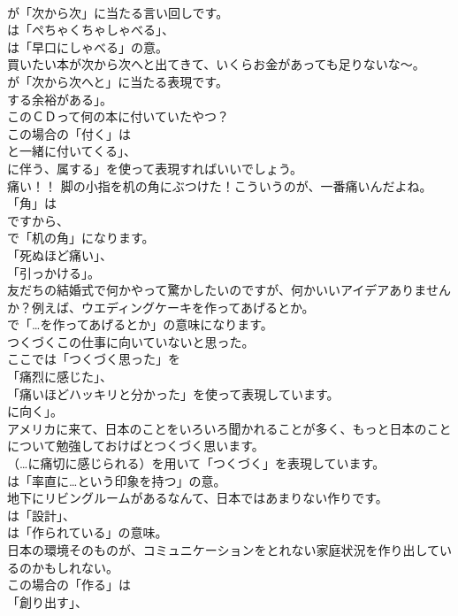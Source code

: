 \documentclass[8pt]{extreport}
\begin{document}
\begin{CJK}{UTF8}{min}
\\	が「次から次」に当たる言い回しです。
\\	は「ぺちゃくちゃしゃべる」、
\\	は「早口にしゃべる」の意。	
\\	買いたい本が次から次へと出てきて、いくらお金があっても足りないな～。 
\\	が「次から次へと」に当たる表現です。
\\	する余裕がある」。	
\\	このＣＤって何の本に付いていたやつ？ 
\\	この場合の「付く」は
\\	と一緒に付いてくる」、
\\	に伴う、属する」を使って表現すればいいでしょう。	
\\	痛い！！ 脚の小指を机の角にぶつけた！こういうのが、一番痛いんだよね。 
\\	「角」は
\\	ですから、
\\	で「机の角」になります。
\\	「死ぬほど痛い」、
\\	「引っかける」。	
\\	友だちの結婚式で何かやって驚かしたいのですが、何かいいアイデアありませんか？例えば、ウエディングケーキを作ってあげるとか。 
\\	で「…を作ってあげるとか」の意味になります。	
\\	つくづくこの仕事に向いていないと思った。 
\\	ここでは「つくづく思った」を
\\	「痛烈に感じた」、
\\	「痛いほどハッキリと分かった」を使って表現しています。
\\	に向く」。	
\\	アメリカに来て、日本のことをいろいろ聞かれることが多く、もっと日本のことについて勉強しておけばとつくづく思います。 
\\	（…に痛切に感じられる）を用いて「つくづく」を表現しています。
\\	は「率直に…という印象を持つ」の意。	
\\	地下にリビングルームがあるなんて、日本ではあまりない作りです。 
\\	は「設計」、
\\	は「作られている」の意味。	
\\	日本の環境そのものが、コミュニケーションをとれない家庭状況を作り出しているのかもしれない。 
\\	この場合の「作る」は
\\	「創り出す」、

\end{CJK}
\end{document}
